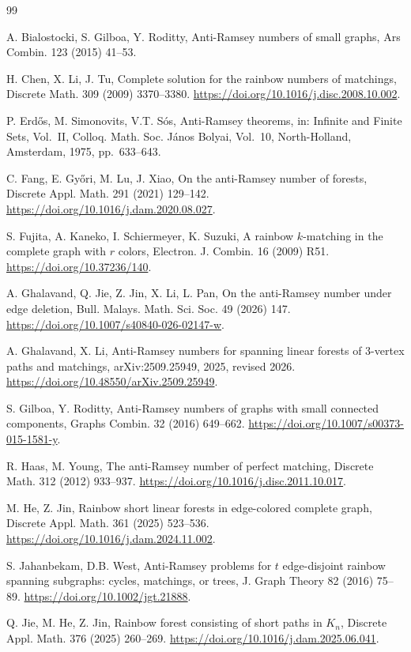 \documentclass[10pt,a4paper]{article}
\begin{document}
\begin{thebibliography}{99}

A. Bialostocki, S. Gilboa, Y. Roditty,
Anti-Ramsey numbers of small graphs,
Ars Combin. 123 (2015) 41--53.

H. Chen, X. Li, J. Tu,
Complete solution for the rainbow numbers of matchings,
Discrete Math. 309 (2009) 3370--3380.
\url{https://doi.org/10.1016/j.disc.2008.10.002}.

P. Erd\H{o}s, M. Simonovits, V.T. S\'os,
Anti-Ramsey theorems,
in: Infinite and Finite Sets, Vol.~II,
Colloq. Math. Soc. J\'anos Bolyai, Vol.~10,
North-Holland, Amsterdam, 1975, pp.~633--643.

C. Fang, E. Gy\H{o}ri, M. Lu, J. Xiao,
On the anti-Ramsey number of forests,
Discrete Appl. Math. 291 (2021) 129--142.
\url{https://doi.org/10.1016/j.dam.2020.08.027}.

S. Fujita, A. Kaneko, I. Schiermeyer, K. Suzuki,
A rainbow $k$-matching in the complete graph with $r$ colors,
Electron. J. Combin. 16 (2009) R51.
\url{https://doi.org/10.37236/140}.

A. Ghalavand, Q. Jie, Z. Jin, X. Li, L. Pan,
On the anti-Ramsey number under edge deletion,
Bull. Malays. Math. Sci. Soc. 49 (2026) 147.
\url{https://doi.org/10.1007/s40840-026-02147-w}.

A. Ghalavand, X. Li,
Anti-Ramsey numbers for spanning linear forests of 3-vertex paths and matchings,
arXiv:2509.25949, 2025, revised 2026.
\url{https://doi.org/10.48550/arXiv.2509.25949}.

S. Gilboa, Y. Roditty,
Anti-Ramsey numbers of graphs with small connected components,
Graphs Combin. 32 (2016) 649--662.
\url{https://doi.org/10.1007/s00373-015-1581-y}.

R. Haas, M. Young,
The anti-Ramsey number of perfect matching,
Discrete Math. 312 (2012) 933--937.
\url{https://doi.org/10.1016/j.disc.2011.10.017}.

M. He, Z. Jin,
Rainbow short linear forests in edge-colored complete graph,
Discrete Appl. Math. 361 (2025) 523--536.
\url{https://doi.org/10.1016/j.dam.2024.11.002}.

S. Jahanbekam, D.B. West,
Anti-Ramsey problems for $t$ edge-disjoint rainbow spanning subgraphs:
cycles, matchings, or trees,
J. Graph Theory 82 (2016) 75--89.
\url{https://doi.org/10.1002/jgt.21888}.

Q. Jie, M. He, Z. Jin,
Rainbow forest consisting of short paths in $K_n$,
Discrete Appl. Math. 376 (2025) 260--269.
\url{https://doi.org/10.1016/j.dam.2025.06.041}.


\end{thebibliography}
\end{document}
